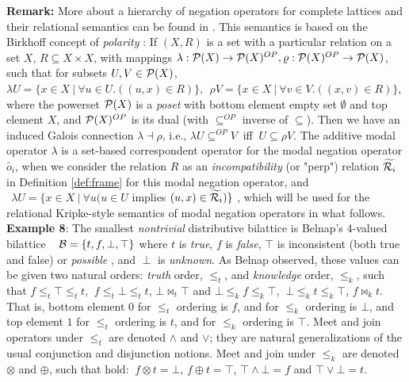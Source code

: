 \documentclass[10pt,twocolumn]{article}
\begin{document}
\textbf{Remark:} More about a hierarchy of negation operators for
complete lattices  and their relational semantics can be found in
\cite{Majk06ml}. This semantics is based on the Birkhoff concept of
\emph{polarity} \cite{Birkh40}: If $(X, R )$ is a set with a
particular relation on a set $X$, $R \subseteq X \times X$,  with
mappings
$\lambda:\P(X)\rightarrow \P(X)^{OP}, \varrho:\P(X)^{OP}\rightarrow \P(X)$, such that for subsets $U,V \in \P(X)$, \\
$\lambda U = \{x \in X~|~\forall u \in U.( (u,x) \in R) \},
~~\rho V = \{x \in X~|~\forall v \in V. ((x,v) \in R )\}$,\\
where the powerset $\P(X)$ is a  \emph{poset} with bottom element
empty set $\emptyset$ and top element $X$, and $\P(X)^{OP}$ is its
dual (with  $\subseteq^{OP}$ inverse of $\subseteq$). Then we have
an induced Galois connection $\lambda \dashv \rho$, i.e., $\lambda U
\subseteq^{OP} V~$ iff $~U \subseteq \rho V$. The additive modal
operator $\lambda$ is a set-based correspondent operator for the
modal negation operator $\widetilde{o_i}$, when we consider the
relation $R$ as an \emph{incompatibility} (or "perp") relation
$\widetilde{\R_i}$  in
 Definition \ref{def:frame} for this modal negation operator, and
$~~\lambda U = \{x \in X~|~\forall u (u \in U$ implies $ (u,x) \in
\widetilde{\R_i}) \}~$, which will be used for the relational
Kripke-style semantics of
modal negation operators in what follows.\\
 \textbf{Example 8}:
 The smallest \emph{nontrivial} distributive bilattice is Belnap's 4-valued
bilattice  ~\cite{Beln77} $\B = \{t,f,\bot, \top\}$ where $t$ is
\emph{true}, $f $ is \emph{false}, $\top$ is inconsistent (both true
and false) or \emph{possible }, and $\perp$ is \emph{unknown}. As
Belnap observed, these values can be given two natural orders:
\emph{truth} order, $\leq_t$, and \emph{knowledge} order, $\leq_k$,
such that $f \leq_t \top \leq_t t$, $~f \leq_t \bot \leq_t t$, $\bot
\bowtie_t \top$ and $\bot \leq_k f \leq_k \top$, $~\bot \leq_k t
\leq_k \top$, $f \bowtie_k t$. That is, bottom element $0$ for
$\leq_t$ ordering is $f$, and for $\leq_k$ ordering is $\bot$,
 and top element $1$ for $\leq_t$ ordering is $t$, and for $\leq_k$ ordering is $\top$.
Meet and join operators under $\leq_t$ are denoted $\wedge$ and
$\vee$; they are natural generalizations of the usual conjunction
and disjunction notions. Meet and join under $\leq_k$ are denoted
$\otimes$ and $\oplus$, such that hold: $~f \otimes t = \bot$, $f
\oplus t =\top$, $\top\wedge \bot
= f$ and $\top \vee \bot = t$.\\
\end{document}
